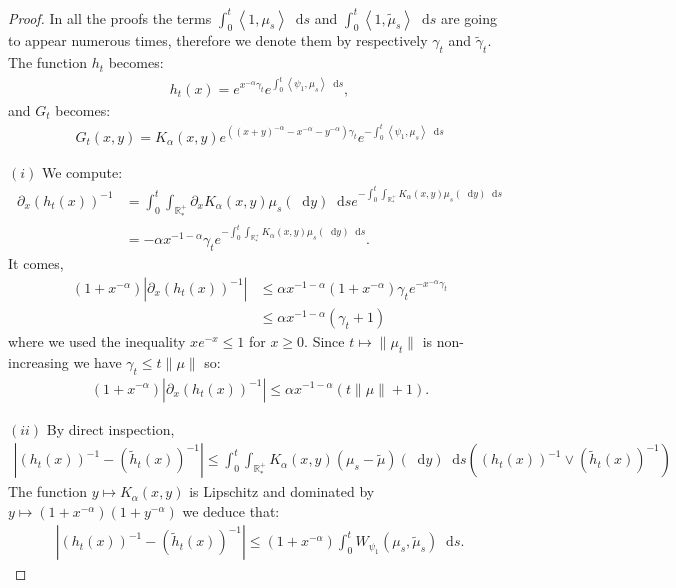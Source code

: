 \documentclass[11pt,a4paper]{article}
\newcommand{\RRP}{\mathbb{R}^+_*}
\newcommand{\brac}[1]{\left\langle#1\right\rangle}
\newcommand{\dd}{\mathop{}\!\mathrm{d}}
\begin{document}
\begin{proof}
    In all the proofs the terms $\int_0^t \brac{1,\mu_s}\dd s$ and $\int_0^t \brac{1,\tilde{\mu}_s}\dd s$ are going to appear numerous times, therefore we denote them by respectively $\gamma_t$ and $\tilde{\gamma}_t$. The function $h_t$ becomes:
    \begin{align*}
        h_t(x) = e^{x^{-\alpha} \gamma_t} e^{\int_0^t \brac{\psi_1,\mu_s} \dd s},
    \end{align*}
    and $G_t$ becomes:
    \begin{align*}
        G_t(x,y) = K_\alpha(x,y) e^{\left((x+y)^{-\alpha} - x^{-\alpha} - y^{-\alpha}\right)\gamma_t} e^{-\int_0^t \brac{\psi_1,\mu_s} \dd s}
    \end{align*}

    $(i)$ We compute:
    \begin{align*}
        \partial_x \left( h_t(x)\right)^{-1} &= \int_0^t \int_{\RRP} \partial_x K_\alpha(x,y) \mu_s(\dd y) \dd s e^{-\int_0^t \int_{\RRP} K_\alpha(x,y) \mu_s(\dd y) \dd s} \\
        &= -\alpha x^{-1-\alpha} \gamma_t e^{-\int_0^t \int_{\RRP} K_\alpha(x,y) \mu_s(\dd y) \dd s}.
    \end{align*}
    It comes,
    \begin{align*} 
        (1 + x^{-\alpha})\left|\partial_x \left( h_t(x)\right)^{-1}\right| &\leq \alpha x^{-1-\alpha} (1 + x^{-\alpha})  \gamma_t e^{-x^{-\alpha} \gamma_t}\\
        &\leq \alpha x^{-1-\alpha}(\gamma_t +1)
    \end{align*}
    where we used the inequality $xe^{-x} \leq 1$ for $x \geq 0$. Since $t\mapsto \| \mu_t\|$ is non-increasing we have $\gamma_t \leq t\|\mu\|$ so:
    \begin{align*}
        (1 + x^{-\alpha})\left|\partial_x \left( h_t(x)\right)^{-1}\right|  \leq \alpha x^{-1-\alpha} \left(t\|\mu\| + 1\right).
    \end{align*}

    $(ii)$ By direct inspection,
    \begin{align*}
        \left|\left( h_t(x)\right)^{-1}-\left( \tilde{h}_t(x)\right)^{-1} \right| \leq \int_0^t \int_{\RRP} K_\alpha(x,y) \left(\mu_s - \tilde{\mu}\right)(\dd y) \dd s \left(\left( h_t(x)\right)^{-1} \vee \left( \tilde{h}_t(x)\right)^{-1} \right) 
    \end{align*}
    The function $y \mapsto K_\alpha(x,y)$ is Lipschitz and dominated by $y \mapsto (1 + x^{-\alpha})(1 + y^{-\alpha})$ we deduce that:
    \begin{align*}
        \left|\left( h_t(x)\right)^{-1}-\left( \tilde{h}_t(x)\right)^{-1} \right| \leq (1 + x^{-\alpha})\int_0^t W_{\psi_1} (\mu_s,\tilde{\mu}_s)\dd s.
    \end{align*} 


\end{proof}
\end{document}

